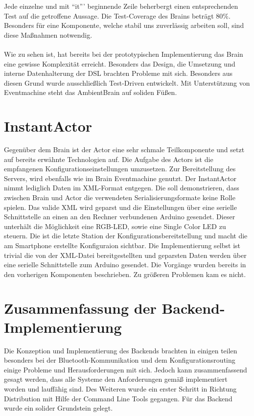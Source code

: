 Jede einzelne und mit "`it"'' beginnende Zeile beherbergt einen entsprechenden Test auf die getroffene Aussage. Die Test-Coverage des Brains beträgt 80\%. Besonders für eine Komponente, welche stabil uns zuverlässig arbeiten soll, sind diese Maßnahmen notwendig. 
\\\\
Wie zu sehen ist, hat bereits bei der prototypischen Implementierung das Brain eine gewisse Komplexität erreicht. Besonders das Design, die Umsetzung und interne Datenhalterung der DSL brachten Probleme mit sich. Besonders aus diesen Grund wurde ausschließlich Test-Driven entwickelt. Mit Unterstützung von Eventmachine steht das AmbientBrain auf soliden Füßen. 
\section{InstantActor}
Gegenüber dem Brain ist der Actor eine sehr schmale Teilkomponente und setzt auf bereits erwähnte Technologien auf. 
Die Aufgabe des Actors ist die empfangenen Konfigurationseinstellungen umzusetzen. Zur Bereitstellung des Servers, wird ebenfalls wie im Brain Eventmachine genutzt. Der InstantActor nimmt lediglich Daten im XML-Format entgegen. Die soll demonstrieren, dass zwischen Brain und Actor die verwendeten Serialisierungsformate keine Rolle spielen. Das valide XML wird geparst und die Einstellungen über eine serielle Schnittstelle an einen an den Rechner verbundenen Arduino gesendet. Dieser unterhält die Möglichkeit eine RGB-LED, sowie eine Single Color LED zu steuern. Die ist die letzte Station der Konfigurationsbereitstellung und macht die am Smartphone erstellte Konfiguraion sichtbar. Die Implementierung selbst ist trivial die von der XML-Datei bereitgestellten und geparsten Daten werden über eine serielle Schnittstelle zum Arduino gesendet. Die Vorgänge wurden bereits in den vorherigen Komponenten beschrieben. Zu größeren Problemen kam es nicht. 

\section{Zusammenfassung der Backend-Implementierung}
Die Konzeption und Implementierung des Backends brachten in einigen teilen besonders bei der Bluetooth-Kommunikation und dem Konfigurationsrouting einige Probleme und Herausforderungen mit sich. Jedoch kann zusammenfassend gesagt werden, dass alle Systeme den Anforderungen gemäß implementiert worden und lauffähig sind. Des Weiteren wurde ein erster Schritt in Richtung Distribution mit Hilfe der Command Line Tools gegangen. Für das Backend wurde ein solider Grundstein gelegt. 

